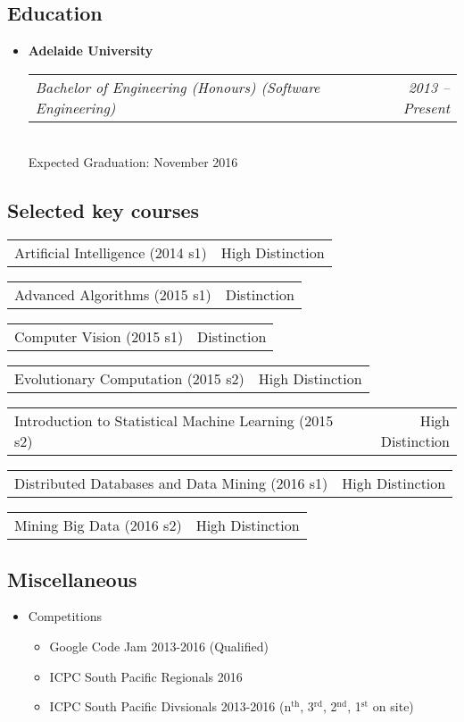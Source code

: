 \documentclass[10pt,letterpaper]{article}
\makeatletter
\newcommand{\headerrow}[2]
{\begin{tabular*}{\linewidth}{l@{\extracolsep{\fill}}r}
  #1 &
  #2 \\
\end{tabular*}}
\makeatother
\begin{document}
  \subsection*{Education}
  \begin{itemize}
    \parskip=0.1em

    \item
    {\textbf{Adelaide University}}
    \\
    \headerrow
      {\emph{Bachelor of Engineering (Honours) (Software Engineering)}}
      {\emph{2013 -- Present}}
    \\
    Expected Graduation: November 2016

  \end{itemize}
  \subsection*{Selected key courses}
  \begin{itemize*}
    \item \headerrow
      {Artificial Intelligence (2014 s1)}
      {High Distinction}
    \item \headerrow
      {Advanced Algorithms (2015 s1)}
      {Distinction}
    \item \headerrow
      {Computer Vision (2015 s1)}
      {Distinction}
    \item \headerrow
      {Evolutionary Computation (2015 s2)}
      {High Distinction}
    \item \headerrow
      {Introduction to Statistical Machine Learning (2015 s2)}
      {High Distinction}
    \item \headerrow
      {Distributed Databases and Data Mining (2016 s1)}
      {High Distinction}
    \item \headerrow
      {Mining Big Data (2016 s2)}
      {High Distinction}
  \end{itemize*}

  \subsection*{Miscellaneous}
  \begin{itemize}
    \item Competitions
      \begin{itemize}
        \item Google Code Jam 2013-2016 (Qualified)
        \item ICPC South Pacific Regionals 2016
        \item ICPC South Pacific Divsionals 2013-2016 (n$^\textrm{th}$, 3$^\textrm{rd}$, 2$^\textrm{nd}$, 1$^\textrm{st}$ on site)
      \end{itemize}
  \end{itemize}
\end{document}

